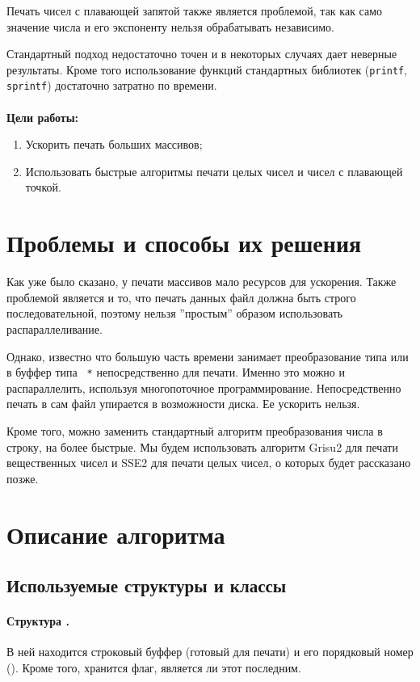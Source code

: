 \documentclass[a4paper, 12pt, twoside]{article}
\begin{document}
Печать чисел с плавающей запятой также является проблемой, так как само значение числа и его экспоненту нельзя обрабатывать независимо. 

Стандартный подход недостаточно точен и в некоторых случаях дает неверные результаты. 
Кроме того использование функций стандартных библиотек (\texttt{printf}, \texttt{sprintf}) достаточно затратно по времени.
\\
\\
\textbf{Цели работы:}
\begin{enumerate}
\item Ускорить печать больших массивов;
\item Использовать быстрые алгоритмы печати целых чисел и чисел с плавающей точкой.
\end{enumerate}

\section{Проблемы и способы их решения}
Как уже было сказано, у печати массивов мало ресурсов для ускорения.
Также проблемой является и то, что печать данных файл должна быть строго последовательной, поэтому нельзя ''простым'' образом использовать распараллеливание.

Однако, известно что большую часть времени занимает преобразование типа \texttt{} или \texttt{} в буффер типа \texttt{ *} непосредственно для печати.
Именно это можно и распараллелить, используя многопоточное программирование.
Непосредственно печать в сам файл упирается в возможности диска. 
Ее ускорить нельзя.

Кроме того, можно заменить стандартный алгоритм преобразования числа в строку, на более быстрые.
Мы будем использовать алгоритм \textsf{Grisu2} для печати вещественных чисел и \textsf{SSE2} для печати целых чисел, о которых будет рассказано позже.


\section{Описание алгоритма}
\subsection{Используемые структуры и классы}
\paragraph{Структура \texttt{}.}
В ней находится строковый буффер (готовый для печати) и его порядковый номер (\texttt{}).
Кроме того, хранится флаг, является ли этот \texttt{} последним.
\end{document}
